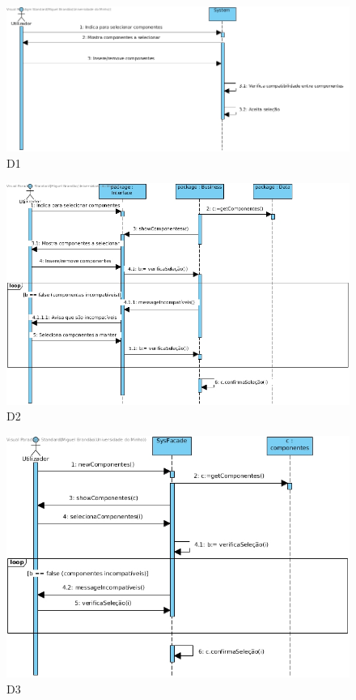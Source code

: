 \begin{figure}[H]
    \centering
    \includegraphics[width=\textwidth]{diagramas_de_sequencia/imgs/UserSystemUC11D1.jpg}
    \caption{D1}
\end{figure}
\begin{figure}[H]
    \centering
    \includegraphics[width=\textwidth]{diagramas_de_sequencia/imgs/UserSystemUC11D2.jpg}
    \caption{D2}
\end{figure}
\begin{figure}[H]
    \centering
    \includegraphics[width=\textwidth]{diagramas_de_sequencia/imgs/UserSystemUC11D3.jpg}
    \caption{D3}
\end{figure}
